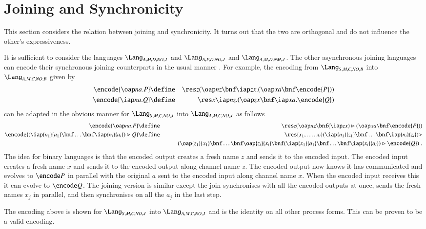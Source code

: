 \documentclass[submission,copyright,creativecommons]{eptcs}
\newcommand{\join}[1]{(#1)\rhd }
\begin{document}
\section{Joining and Synchronicity}
\label{sec:join_synch}

This section considers the relation between joining and synchronicity. It turns out that
the two are orthogonal and do not influence the other's expressiveness.

It is sufficient to consider the languages $\Lang_{A,M,D,\mathit{NO},J}$ and
$\Lang_{A,P,D,\mathit{NO},J}$ and $\Lang_{A,M,D,\mathit{NM},J}$.
The other asynchronous joining languages can encode their synchronous joining
counterparts in the usual manner \cite{honda1991object}. 
For example, the encoding from $\Lang_{S,M,C,\mathit{NO},B}$ into $\Lang_{A,M,C,\mathit{NO},B}$
given by
\begin{eqnarray*}
\encode{\oap n a . P} &\define& \res z (\oap n z \bnf \iap z x.    (\oap x a \bnf \encode{P}))\\
\encode{\iap n a . Q} &\define& \res x  \iap n z.(    \oap z x \bnf \iap x a . \encode{Q})
\end{eqnarray*}
can be adapted in the obvious manner for
$\Lang_{S,M,C,\mathit{NO},J}$ into $\Lang_{A,M,C,\mathit{NO},J}$ as follows
\begin{eqnarray*}
\encode{\oap n a . P} &\define& \res z (\oap n z \bnf \join {\iap z x}    (\oap x a \bnf \encode{P}))\\
\encode{\join{\iap {n_1} {a_1}\bnf\ldots\bnf \iap {n_i} {a_i}} Q} &\define&
\res {x_1,\ldots,x_i}  \join {\iap {n_1} {z_1}\bnf \ldots\bnf \iap {n_i} {z_i}}\\
&&\qquad(    \oap {z_1} {x_1} \bnf \ldots \bnf \oap {z_i} {x_i} \bnf \join
  {\iap {x_1} {a_1}\bnf\ldots\bnf \iap {x_i} {a_i} } \encode{Q})\; .
\end{eqnarray*}
The idea for binary languages is that the encoded output creates a fresh name $z$ and sends it to the encoded input.
The encoded input creates a fresh name $x$ and sends it to the encoded output along channel name $z$.
The encoded output now knows it has communicated and evolves to $\encode P$ in parallel with the
original $a$ sent to the encoded input along channel name $x$.
When the encoded input receives this it can evolve to $\encode Q$.
The joining version is similar except the join synchronises with all the encoded outputs at once,
sends the fresh names $x_j$ in parallel, and then synchronises on all the $a_j$ in the last step.

The encoding above is shown for $\Lang_{S,M,C,\mathit{NO},J}$ into $\Lang_{A,M,C,\mathit{NO},J}$
and is the identity on all other process forms. This can be proven to be a valid encoding.
\end{document}
